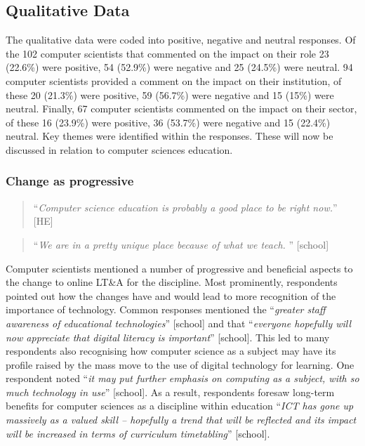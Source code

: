 \documentclass[sigconf]{acmart}
\begin{document}
\subsection{Qualitative Data}\label{qualdata}

The qualitative data were coded into positive, negative and neutral
responses. Of the 102 computer scientists that commented on the impact
on their role 23 (22.6\%) were positive, 54 (52.9\%) were negative and
25 (24.5\%) were neutral.  94 computer scientists provided a comment
on the impact on their institution, of these 20 (21.3\%) were
positive, 59 (56.7\%) were negative and 15 (15\%) were
neutral. Finally, 67 computer scientists commented on the impact on
their sector, of these 16 (23.9\%) were positive, 36 (53.7\%) were
negative and 15 (22.4\%) neutral. Key themes were identified within
the responses. These will now be discussed in relation to computer
sciences education.

\subsubsection{Change as progressive}

\begin{quotation}
``{\emph{Computer science education is probably a good place to be
right now.}}'' [HE]
\end{quotation}

\begin{quotation}
``{\emph{We are in a pretty unique place because of what we
teach. }}'' [school]
\end{quotation}

Computer scientists mentioned a number of progressive and beneficial
aspects to the change to online LT\&A for the discipline. Most
prominently, respondents pointed out how the changes have and would
lead to more recognition of the importance of technology. Common
responses mentioned the ``{\emph{greater staff awareness of
educational technologies}}” [school] and that ``{\emph{everyone
hopefully will now appreciate that digital literacy is important}}''
[school]. This led to many respondents also recognising how computer
science as a subject may have its profile raised by the mass move to
the use of digital technology for learning. One respondent noted
``{\emph{it may put further emphasis on computing as a subject, with
so much technology in use}}'' [school]. As a result, respondents
foresaw long-term benefits for computer sciences as a discipline
within education ``{\emph{ICT has gone up massively as a valued skill
-- hopefully a trend that will be reflected and its impact will be
increased in terms of curriculum timetabling}}'' [school].
\end{document}
